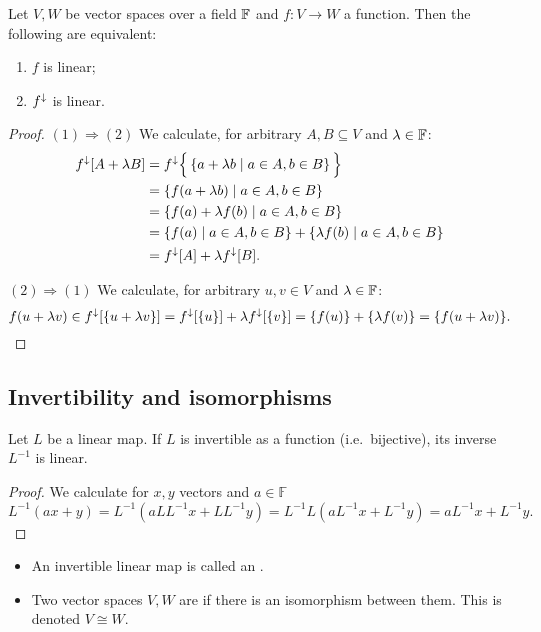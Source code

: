 \begin{lemma} \label{linearImageFunction}
Let $V,W$ be vector spaces over a field $\mathbb{F}$ and $f: V\to W$ a function. Then the following are equivalent:
\begin{enumerate}
\item $f$ is linear;
\item $f^\downarrow$ is linear.
\end{enumerate}
\end{lemma}
\begin{proof}
$(1) \Rightarrow (2)$ We calculate, for arbitrary $A,B\subseteq V$ and $\lambda\in \mathbb{F}$:
\begin{align*}
f^\downarrow[A+\lambda B] &= f^\downarrow\Big\{\left\{ a+\lambda b \;\middle|\; a\in A, b\in B \right\}\Big\} \\
&= \left\{ f(a+\lambda b) \;\middle|\; a\in A, b\in B \right\} \\
&= \left\{ f(a)+\lambda f(b) \;\middle|\; a\in A, b\in B \right\} \\
&= \left\{ f(a) \;\middle|\; a\in A, b\in B \right\} + \left\{ \lambda f(b) \;\middle|\; a\in A, b\in B \right\} \\
&= f^\downarrow[A]+ \lambda f^\downarrow[B].
\end{align*}

$(2) \Rightarrow (1)$ We calculate, for arbitrary $u,v\in V$ and $\lambda\in \mathbb{F}$:
\[ f(u+\lambda v) \in f^\downarrow[\{u+\lambda v\}] = f^\downarrow[\{u\}] + \lambda f^\downarrow[\{v\}] = \{f(u)\} +\{\lambda f(v)\} = \{f(u+\lambda v)\}. \]
\end{proof}

\subsection{Invertibility and isomorphisms}
\begin{lemma} \label{inverseLinear}
Let $L$ be a linear map. If $L$ is invertible as a function (i.e.\ bijective), its inverse $L^{-1}$ is linear.
\end{lemma}
\begin{proof}
We calculate for $x,y$ vectors and $a\in\mathbb{F}$
\[ L^{-1}(ax + y) = L^{-1}(aLL^{-1}x + LL^{-1}y) = L^{-1}L(aL^{-1}x + L^{-1}y) = aL^{-1}x + L^{-1}y. \]
\end{proof}

\begin{definition}
\begin{itemize}
\item An invertible linear map is called an .
\item Two vector spaces $V,W$  are  if there is an isomorphism between them. This is denoted $V\cong W$.
\end{itemize}
\end{definition}

